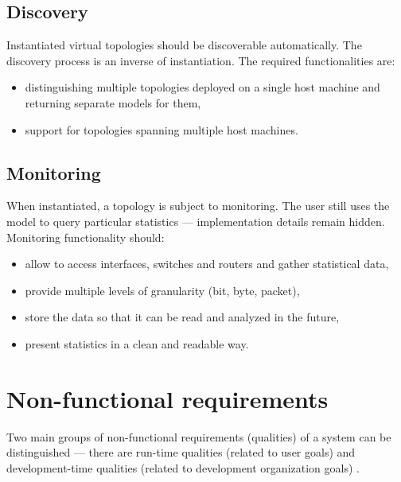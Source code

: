 \documentclass[11pt,openany]{book}
\begin{document}
      \subsection{Discovery}
      \label{sec:req:func:disc}

        Instantiated virtual topologies should be discoverable automatically. The discovery process is an inverse of
        instantiation. The required functionalities are:

        \begin{itemize}
          \item distinguishing multiple topologies deployed on a single host machine and returning separate models for
                them,
          \item support for topologies spanning multiple host machines.
        \end{itemize}


      \subsection{Monitoring}
      \label{sec:req:func:acc}

        When instantiated, a topology is subject to monitoring. The user still uses the model to query particular
        statistics --- implementation details remain hidden. Monitoring functionality should:

        \begin{itemize}
          \item allow to access interfaces, switches and routers and gather statistical data,
          \item provide multiple levels of granularity (bit, byte, packet),
          \item store the data so that it can be read and analyzed in the future,
          \item present statistics in a clean and readable way.
        \end{itemize}


    \section{Non-functional requirements}
    \label{sec:req:nonfunc}

      Two main groups of non-functional requirements (qualities) of a system can be distinguished --- there are run-time
      qualities (related to user goals) and development-time qualities (related to development organization goals)
      \cite{nonfunctional}.
\end{document}
